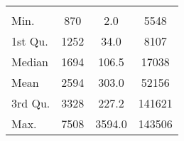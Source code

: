 \begin{tabular}{lS[table-format=5.1]S[table-format=5.1]S[table-format=5.1]}
&  &  &  \\
 Min.    & 870 & 2.0 & 5548 \\
 1st Qu. & 1252 & 34.0 & 8107 \\
 Median  & 1694 & 106.5 & 17038 \\
 Mean    & 2594 & 303.0 & 52156 \\
 3rd Qu. & 3328 & 227.2 & 141621 \\
 Max.    & 7508 & 3594.0 & 143506 \\
\end{tabular}
